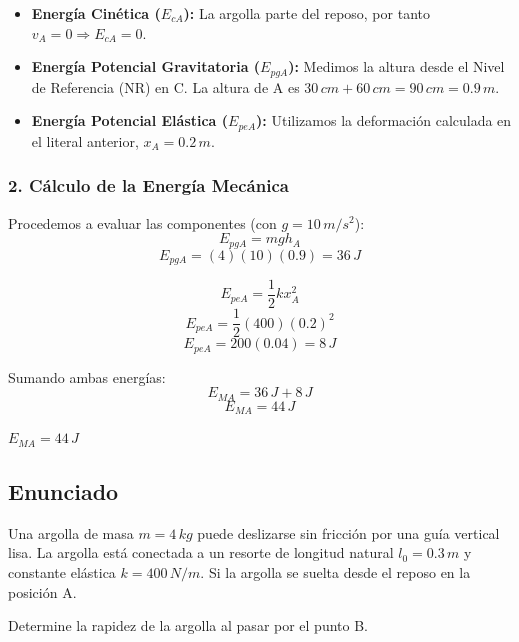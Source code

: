 \documentclass[12pt, a4paper]{article}
\begin{document}
\begin{itemize}
    \item \textbf{Energía Cinética ($E_{cA}$):} La argolla parte del reposo, por tanto $v_A = 0 \Rightarrow E_{cA} = 0$.
    \item \textbf{Energía Potencial Gravitatoria ($E_{pgA}$):} Medimos la altura desde el Nivel de Referencia (NR) en C. La altura de A es $30 \, \si{cm} + 60 \, \si{cm} = 90 \, \si{cm} = 0.9 \, \si{m}$.
    \item \textbf{Energía Potencial Elástica ($E_{peA}$):} Utilizamos la deformación calculada en el literal anterior, $x_A = 0.2 \, \si{m}$.
\end{itemize}

\subsubsection*{2. Cálculo de la Energía Mecánica}
Procedemos a evaluar las componentes (con $g = 10 \, \si{m/s^2}$):
$$ E_{pgA} = m g h_A $$
$$ E_{pgA} = (4)(10)(0.9) = 36 \, \si{J} $$

$$ E_{peA} = \frac{1}{2} k x_A^2 $$
$$ E_{peA} = \frac{1}{2} (400) (0.2)^2 $$
$$ E_{peA} = 200 (0.04) = 8 \, \si{J} $$

Sumando ambas energías:
$$ E_{MA} = 36 \, \si{J} + 8 \, \si{J} $$
$$ E_{MA} = 44 \, \si{J} $$

\begin{tcolorbox}[colback=green!5!white, colframe=green!50!black, title=Respuesta Final]
\centering \Large $E_{MA} = 44 \, \si{J}$
\end{tcolorbox}

\newpage

\subsection*{Enunciado}
Una argolla de masa $m = 4 \, \si{kg}$ puede deslizarse sin fricción por una guía vertical lisa. La argolla está conectada a un resorte de longitud natural $l_0 = 0.3 \, \si{m}$ y constante elástica $k = 400 \, \si{N/m}$. Si la argolla se suelta desde el reposo en la posición A. 

Determine la rapidez de la argolla al pasar por el punto B.
\end{document}
